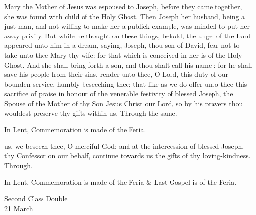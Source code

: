  Mary the Mother of Jesus was espoused to Joseph, before they came together, she was found with child of the Holy Ghost. Then Joseph her husband, being a just man, and not willing to make her a publick example, was minded to put her away privily. But while he thought on these things, behold, the angel of the Lord appeared unto him in a dream, saying, Joseph, thou son of David, fear not to take unto thee Mary thy wife: for that which is conceived in her is of the Holy Ghost. And she shall bring forth a son, and thou shalt call his name : for he shall save his people from their sins.
\secret
{} render unto thee, O Lord, this duty of our bounden service, humbly beseeching thee: that like as we do offer unto thee this sacrifice of praise in honour of the venerable festivity of blessed Joseph, the Spouse of the Mother of thy Son Jesus Christ our Lord, so by his prayers thou wouldest preserve thy gifts within us. Through the same.
\begin{rubric}
    In Lent, Commemoration is made of the Feria.
\end{rubric}
\postcommunion
{} us, we beseech thee, O merciful God: and at the intercession of blessed Joseph, thy Confessor on our behalf, continue towards us the gifts of thy loving-kindness. Through.
\begin{rubric}
    In Lent, Commemoration is made of the Feria \& Last Gospel is of the Feria.
\end{rubric}

\begin{inhead}
    {Second Class Double\\
21 March}
\end{inhead}
\par\noindent
{}

